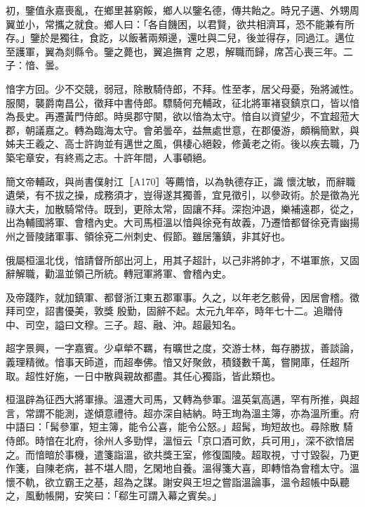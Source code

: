 \begin{pinyinscope}
 初，鑒值永嘉喪亂，在鄉里甚窮餒，鄉人以鑒名德，傳共飴之。時兄子邁、外甥周翼並小，常攜之就食。鄉人曰：「各自饑困，以君賢，欲共相濟耳，恐不能兼有所存。」鑒於是獨往，食訖，以飯著兩頰邊，還吐與二兒，後並得存，同過江。邁位至護軍，翼為剡縣令。鑒之薨也，翼追撫育
 之恩，解職而歸，席苫心喪三年。二子：愔、曇。



 愔字方回。少不交競，弱冠，除散騎侍郎，不拜。性至孝，居父母憂，殆將滅性。服闋，襲爵南昌公，徵拜中書侍郎。驃騎何充輔政，征北將軍褚裒鎮京口，皆以愔為長史。再遷黃門侍郎。時吳郡守闋，欲以愔為太守。愔自以資望少，不宜超蒞大郡，朝議嘉之。轉為臨海太守。會弟曇卒，益無處世意，在郡優游，頗稱簡默，與姊夫王羲之、高士許詢並有邁世之風，俱棲心絕穀，修黃老之術。後以疾去職，乃築宅章安，有終焉之志。十許年間，人事頓絕。



 簡文帝輔政，與尚書僕射江［A170］等薦愔，以為執德存正，識
 懷沈敏，而辭職遺榮，有不拔之操，成務須才，豈得遂其獨善，宜見徵引，以參政術。於是徵為光祿大夫，加散騎常侍。既到，更除太常，固讓不拜。深抱沖退，樂補遠郡，從之，出為輔國將軍、會稽內史。大司馬桓溫以愔與徐兗有故義，乃遷愔都督徐兗青幽揚州之晉陵諸軍事、領徐兗二州刺史、假節。雖居籓鎮，非其好也。



 俄屬桓溫北伐，愔請督所部出河上，用其子超計，以己非將帥才，不堪軍旅，又固辭解職，勸溫並領己所統。轉冠軍將軍、會稽內史。



 及帝踐阼，就加鎮軍、都督浙江東五郡軍事。久之，以年老乞骸骨，因居會稽。徵拜司空，詔書優美，敦獎
 殷勤，固辭不起。太元九年卒，時年七十二。追贈侍中、司空，謚曰文穆。三子。超、融、沖。超最知名。



 超字景興，一字嘉賓。少卓犖不羈，有曠世之度，交游士林，每存勝拔，善談論，義理精微。愔事天師道，而超奉佛。愔又好聚斂，積錢數千萬，嘗開庫，任超所取。超性好施，一日中散與親故都盡。其任心獨詣，皆此類也。



 桓溫辟為征西大將軍掾。溫遷大司馬，又轉為參軍。溫英氣高邁，罕有所推，與超言，常謂不能測，遂傾意禮待。超亦深自結納。時王珣為溫主簿，亦為溫所重。府中語曰：「髯參軍，短主簿，能令公喜，能令公怒。」超髯，珣短故也。尋除散
 騎侍郎。時愔在北府，徐州人多勁悍，溫恒云「京口酒可飲，兵可用」，深不欲愔居之。而愔暗於事機，遣箋詣溫，欲共獎王室，修復園陵。超取視，寸寸毀裂，乃更作箋，自陳老病，甚不堪人間，乞閑地自養。溫得箋大喜，即轉愔為會稽太守。溫懷不軌，欲立霸王之基，超為之謀。謝安與王坦之嘗詣溫論事，溫令超帳中臥聽之，風動帳開，安笑曰：「郗生可謂入幕之賓矣。」




\end{pinyinscope}
